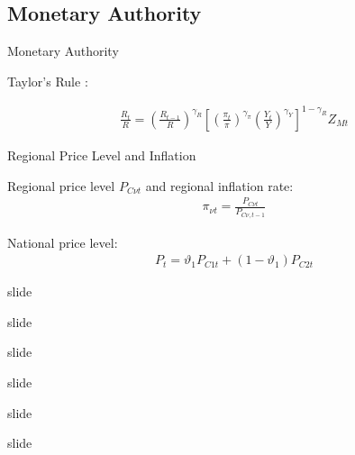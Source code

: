 \documentclass[
presentation.tex
]{subfiles}
\begin{document}

\subsection{Monetary Authority}

\begin{frame}{Monetary Authority}
	
	Taylor's Rule \cite{taylor_discretion_1993}:
	
	\begin{align}
		\frac{R_t}{R} =
		\left( \frac{R_{t-1}}{R} \right)^{\gamma_R}  \left[
		\left( \frac{\pi_t}{\pi} \right)^{\gamma_\pi}
		\left( \frac{Y_t}{Y} \right)^{\gamma_Y} \right]^{1-\gamma_R} Z_{Mt}
	\end{align}	
	
	
\end{frame}


\begin{frame}{Regional Price Level and Inflation}
	
	Regional price level $P_{C\nu t}$ and regional inflation rate:
	\begin{align}
		\pi_{\nu t} = \frac{P_{C\nu t}}{P_{C\nu, t-1}} \label{eq:regional-inflation}
	\end{align}
	
	National price level:
	\begin{align}
		P_t = \vartheta_1 P_{C1 t} + (1 -\vartheta_1) P_{C2 t}
		\label{eq:national-price-level}
	\end{align}
	
	
	
\end{frame}


\begin{frame}{slide}
	
	slide
	
\end{frame}


\begin{frame}{slide}
	
	slide
	
\end{frame}


\begin{frame}{slide}
	
	slide
	
\end{frame}
\end{document}

